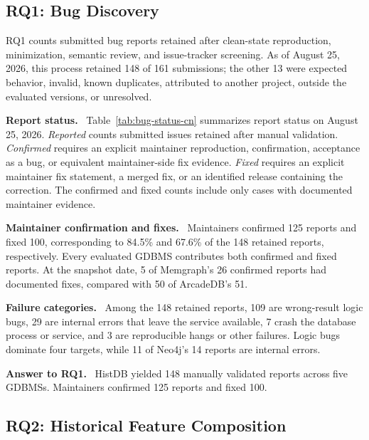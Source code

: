 \documentclass[acmsmall,screen,anonymous]{acmart}
\newcommand{\cnpara}[1]{\par\noindent\textbf{#1.}\ }
\begin{document}
\subsection{RQ1: Bug Discovery}
\label{sec:rq1}


RQ1 counts submitted bug reports retained after clean-state reproduction, minimization, semantic review, and issue-tracker screening. As of August 25, 2026, this process retained 148 of 161 submissions; the other 13 were expected behavior, invalid, known duplicates, attributed to another project, outside the evaluated versions, or unresolved.
\cnpara{Report status}
Table~\ref{tab:bug-status-cn} summarizes report status on August 25, 2026. \emph{Reported} counts submitted issues retained after manual validation. \emph{Confirmed} requires an explicit maintainer reproduction, confirmation, acceptance as a bug, or equivalent maintainer-side fix evidence. \emph{Fixed} requires an explicit maintainer fix statement, a merged fix, or an identified release containing the correction. The confirmed and fixed counts include only cases with documented maintainer evidence.

\begin{table}[htbp]

\end{table}



\cnpara{Maintainer confirmation and fixes}
Maintainers confirmed 125 reports and fixed 100, corresponding to 84.5\% and 67.6\% of the 148 retained reports, respectively. Every evaluated GDBMS contributes both confirmed and fixed reports. At the snapshot date, 5 of Memgraph's 26 confirmed reports had documented fixes, compared with 50 of ArcadeDB's 51.

\cnpara{Failure categories}
Among the 148 retained reports, 109 are wrong-result logic bugs, 29 are internal errors that leave the service available, 7 crash the database process or service, and 3 are reproducible hangs or other failures. Logic bugs dominate four targets, while 11 of Neo4j's 14 reports are internal errors.


\cnpara{Answer to RQ1}
HistDB yielded 148 manually validated reports across five GDBMSs. Maintainers confirmed 125 reports and fixed 100.

\subsection{RQ2: Historical Feature Composition}
\label{sec:rq2}
\end{document}
